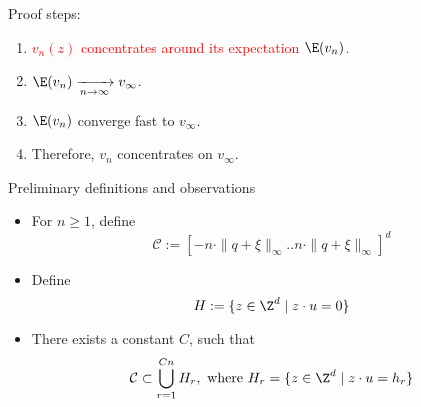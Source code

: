 \begin{frame}{Proof steps:}
  \begin{enumerate}
    \item \textcolor<2->{red}{$v_n(z)$ concentrates around its expectation $\E(v_n)$.}
    \item $\E(v_n) \xrightarrow[n \to \infty]{} v_{\infty}$.
    \item $\E(v_n)$ converge fast to $v_{\infty}$.
    \item Therefore, $v_n$ concentrates on $v_{\infty}$.
  \end{enumerate}

  \vspace{1.0cm}
\end{frame}

\begin{frame}{Preliminary definitions and observations}
  \begin{itemize}
    \item For $n \geq 1$, define 
    \[
      \mathcal{C} := [-n\cdot\|q+\xi\|_{\infty}..n\cdot\|q+\xi\|_{\infty}]^d
    \]
    \item Define 
    \[
      H := \{z \in \Z^d \mid z \cdot u = 0\}
    \]
    \item There exists a constant $C$, such that 
    $$ 
      \mathcal{C} \subset \bigcup_{r = 1}^{Cn}H_r, \text{ where } H_r = \{z \in \Z^d \mid z \cdot u = h_r\}
    $$
  \end{itemize}
\end{frame}

